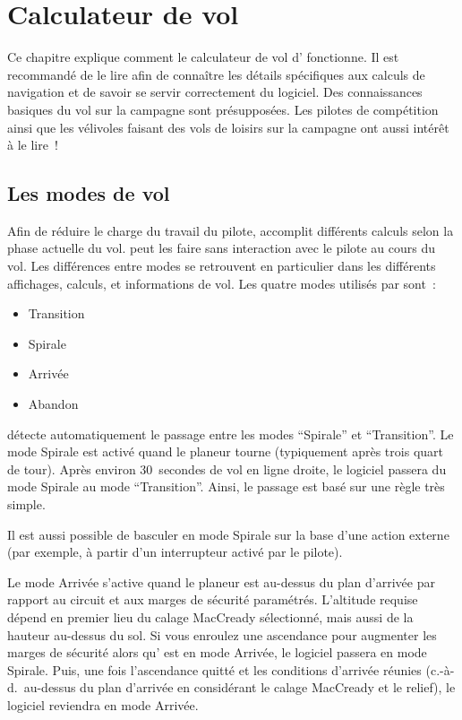 
\chapter{Calculateur de vol}\label{cha:glide}
Ce chapitre explique comment le calculateur de vol d'\xc{} fonctionne.
Il est recommandé de le lire afin de connaître les détails spécifiques aux calculs de navigation et de savoir se servir correctement du logiciel.
Des connaissances basiques du vol sur la campagne sont présupposées.
Les pilotes de compétition ainsi que les vélivoles faisant des vols de loisirs sur la campagne ont aussi intérêt à le lire~!


\section{Les modes de vol}\label{sec:flightmodes} 

Afin de réduire le charge du travail du pilote, \xc{} accomplit différents calculs selon la phase actuelle du vol.
\xc{} peut les faire sans interaction avec le pilote au cours du vol.
Les différences entre modes se retrouvent en particulier dans les différents affichages, calculs, et informations de vol.
Les quatre modes utilisés par \xc{} sont~:
\begin{itemize}
\item Transition
\item Spirale
\item Arrivée
\item Abandon
\end{itemize}
\xc{} détecte automatiquement le passage entre les modes ``Spirale'' et ``Transition''.
Le mode Spirale est activé quand le planeur tourne (typiquement après trois quart de tour).
Après environ 30~secondes de vol en ligne droite, le logiciel passera du mode Spirale au mode ``Transition''.
Ainsi, le passage est basé sur une règle très simple.

Il est aussi possible de basculer en mode Spirale sur la base d'une action externe (par exemple, à partir d'un interrupteur activé par le pilote).

Le mode Arrivée s'active quand le planeur est au-dessus du plan d'arrivée par rapport au circuit et aux marges de sécurité paramétrés.
L'altitude requise dépend en premier lieu du calage MacCready sélectionné, mais aussi de la hauteur au-dessus du sol.
Si vous enroulez une ascendance pour augmenter les marges de sécurité alors qu'\xc{} est en mode Arrivée, le logiciel passera en mode Spirale.
Puis, une fois l'ascendance quitté et les conditions d'arrivée réunies (c.-à-d.\ au-dessus du plan d'arrivée en considérant le calage MacCready et le relief), le logiciel reviendra en mode Arrivée.

